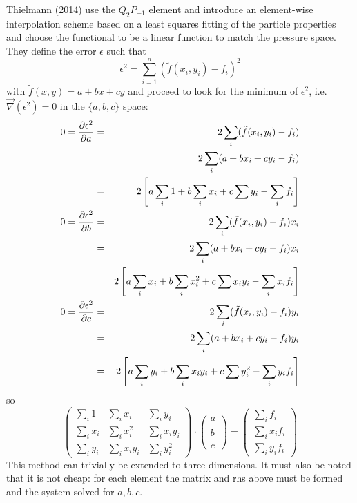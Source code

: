 Thielmann \etal (2014) \cite{thmk14} use the $Q_2P_{-1}$ element and introduce an 
element-wise interpolation
scheme based on a least squares fitting of the particle properties and choose the functional to 
be a linear function to match the pressure space. 
They define the error $\epsilon$ such that 
\[
\epsilon^2 = \sum_{i=1}^n ( \tilde{f}(x_i,y_i)-f_i)^2
\]
with $\tilde{f}(x,y)=a+bx+cy$ and proceed to  
look for the minimum of $\epsilon^2$, i.e. $\vec\nabla(\epsilon^2)=0$ in the $\{a,b,c\}$ space:
\begin{eqnarray}
0=\frac{\partial \epsilon^2}{\partial a} 
&=& 2\sum\limits_i ( \tilde{f}(x_i,y_i)-f_i) \nonumber\\
&=& 2\sum\limits_i ( a + bx_i +cy_i -f_i) \nonumber\\
&=& 2 \left[ a \sum\limits_i 1 + b \sum\limits_i x_i + c \sum y_i - \sum\limits_i f_i \right] \nonumber\\
0=\frac{\partial \epsilon^2}{\partial b} &=& 2\sum\limits_i ( \tilde{f}(x_i,y_i)-f_i) x_i \nonumber\\
&=& 2\sum\limits_i ( a + bx_i +cy_i -f_i) x_i \nonumber\\
&=& 2 \left[ a \sum\limits_i x_i  + b \sum\limits_i x_i^2 + c \sum x_i y_i - \sum\limits_i x_i f_i \right]\nonumber\\
0=\frac{\partial \epsilon^2}{\partial c} &=& 2\sum\limits_i ( \tilde{f}(x_i,y_i)-f_i) y_i \nonumber\\ 
&=& 2\sum\limits_i ( a + bx_i +cy_i -f_i) y_i \nonumber\\
&=& 2 \left[ a \sum\limits_i y_i + b \sum\limits_i x_i y_i + c \sum y_i^2 - \sum\limits_i y_if_i \right] \nonumber
\end{eqnarray}
so 
\[
\left( 
\begin{array}{ccc}
\sum\limits_i 1 & \sum\limits_i x_i & \sum\limits_i y_i \\
\sum\limits_i x_i & \sum\limits_i x_i^2 & \sum\limits_i x_iy_i \\
\sum\limits_i y_i & \sum\limits_i x_i y_i & \sum\limits_i y_i^2 
\end{array}
\right)
\cdot
\left(
\begin{array}{c}
a\\ \\
b\\ \\
c
\end{array}
\right)
=
\left(
\begin{array}{c}
\sum\limits_i f_i \\
\sum\limits_i x_i f_i \\
\sum\limits_i y_i f_i 
\end{array}
\right)
\]
This method can trivially be extended to three dimensions. It must also be noted that 
it is not cheap: for each element the matrix and rhs above must be formed and the system 
solved for $a,b,c$. 


